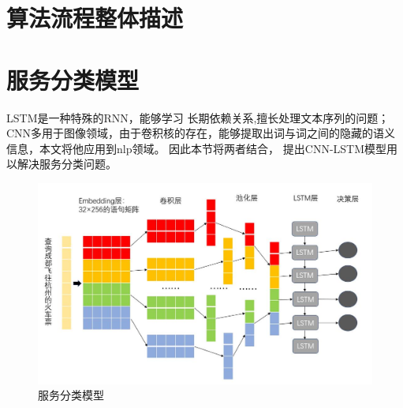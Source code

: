 \section{算法流程整体描述}

\section{服务分类模型}
LSTM是一种特殊的RNN，能够学习 长期依赖关系,擅长处理文本序列的问题；CNN多用于图像领域，由于卷积核的存在，能够提取出词与词之间的隐藏的语义信息，本文将他应用到nlp领域。
因此本节将两者结合， 提出CNN-LSTM模型用以解决服务分类问题。

\begin{figure}[htbp]
    \centering
    \includegraphics[scale=0.5]{./images/cnn-lstm.jpg}
    \caption{服务分类模型}
    \label{fig:cnn-lstm}
  \end{figure}








